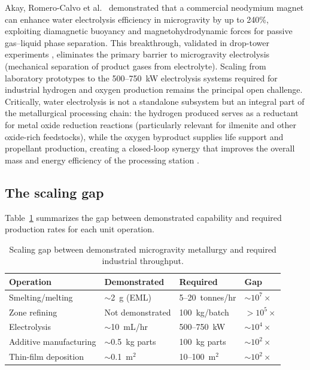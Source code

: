 \documentclass[preprint,12pt]{elsarticle}
\begin{document}
Akay, Romero-Calvo et al.\ \cite{akay2025} demonstrated that a commercial neodymium magnet can enhance water electrolysis efficiency in microgravity by up to 240\%, exploiting diamagnetic buoyancy and magnetohydrodynamic forces for passive gas--liquid phase separation. This breakthrough, validated in drop-tower experiments \cite{romerocalo2022}, eliminates the primary barrier to microgravity electrolysis (mechanical separation of product gases from electrolyte). Scaling from laboratory prototypes to the 500--750~kW electrolysis systems required for industrial hydrogen and oxygen production remains the principal open challenge. Critically, water electrolysis is not a standalone subsystem but an integral part of the metallurgical processing chain: the hydrogen produced serves as a reductant for metal oxide reduction reactions (particularly relevant for ilmenite and other oxide-rich feedstocks), while the oxygen byproduct supplies life support and propellant production, creating a closed-loop synergy that improves the overall mass and energy efficiency of the processing station \cite{schwandt2012,sanders2013}.

\subsection{The scaling gap}

Table~\ref{tab:scaling-gap} summarizes the gap between demonstrated capability and required production rates for each unit operation.

\begin{table}[ht]
\centering
\caption{Scaling gap between demonstrated microgravity metallurgy and required industrial throughput.}
\label{tab:scaling-gap}
\begin{tabular}{llll}
\toprule
\textbf{Operation} & \textbf{Demonstrated} & \textbf{Required} & \textbf{Gap} \\
\midrule
Smelting/melting & $\sim$2~g (EML) & 5--20~tonnes/hr & $\sim 10^{7}\times$ \\
Zone refining & Not demonstrated & 100~kg/batch & $> 10^{5}\times$ \\
Electrolysis & $\sim$10~mL/hr & 500--750~kW & $\sim 10^{4}\times$ \\
Additive manufacturing & $\sim$0.5~kg parts & 100~kg parts & $\sim 10^{2}\times$ \\
Thin-film deposition & $\sim$0.1~m$^2$ & 10--100~m$^2$ & $\sim 10^{2}\times$ \\
\bottomrule
\end{tabular}
\end{table}
\end{document}
